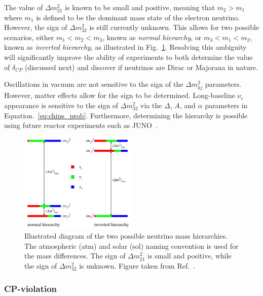 The value of $\Delta m_{21}^2$ is known to be small and positive, meaning that $m_{2}>m_{1}$ where
$m_{1}$ is defined to be the dominant mass state of the electron neutrino. However, the sign of
$\Delta m_{32}^2$ is still currently unknown. This allows for two possible scenarios, either
$m_1<m_2<m_3$, known as \emph{normal hierarchy}, or $m_3<m_1<m_2$, known as \emph{inverted
    hierarchy}, as illustrated in Fig.~\ref{fig:hierarchy}. Resolving this ambiguity will
significantly improve the ability of experiments to both determine the value of $\delta_{CP}$
(discussed next) and discover if neutrinos are Dirac or Majorana in nature.

Oscillations in vacuum are not sensitive to the sign of the $\Delta m_{kj}^{2}$ parameters.
However, matter effects allow for the sign to be determined. Long-baseline $\nu_{e}$ appearance is
sensitive to the sign of $\Delta m_{32}^2$ via the $\Delta$, $A$, and $\alpha$ parameters in
Equation.~\ref{eq:chips_prob}. Furthermore, determining the hierarchy is possible using future
reactor experiments such as JUNO~\cite{an2016}.

\begin{figure} %
    \includegraphics[origin=c,width=0.5\textwidth]{diagrams/3-theory/hierarchy.png}
    \caption[Illustration of the two possible neutrino mass hierarchies]
    {Illustrated diagram of the two possible neutrino mass hierarchies. The atmospheric (atm) and
        solar (sol) naming convention is used for the mass differences. The sign of $\Delta
            m_{21}^{2}$ is small and positive, while the sign of $\Delta m_{32}^{2}$ is unknown.
        Figure taken from Ref.~\cite{gouvea2013}.}
    \label{fig:hierarchy}
\end{figure}

\subsubsection*{CP-violation} %

